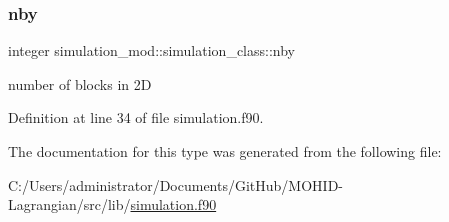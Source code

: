 \subsubsection{\texorpdfstring{nby}{nby}}
{\footnotesize\ttfamily integer simulation\+\_\+mod\+::simulation\+\_\+class\+::nby\hspace{0.3cm}{\ttfamily [private]}}



number of blocks in 2D 



Definition at line 34 of file simulation.\+f90.



The documentation for this type was generated from the following file\+:\begin{DoxyCompactItemize}
\item 
C\+:/\+Users/administrator/\+Documents/\+Git\+Hub/\+M\+O\+H\+I\+D-\/\+Lagrangian/src/lib/\mbox{\hyperlink{simulation_8f90}{simulation.\+f90}}\end{DoxyCompactItemize}
